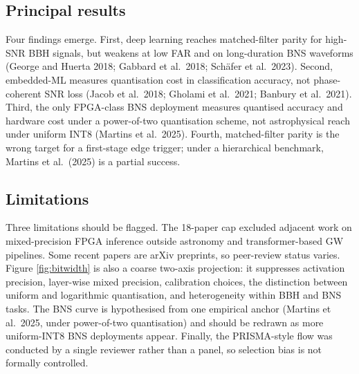 \documentclass[11pt,a4paper]{article}
\begin{document}
\subsection{Principal results}
Four findings emerge. First, deep learning reaches matched-filter parity for high-SNR BBH signals, but weakens at low FAR and on long-duration BNS waveforms (George and Huerta 2018; Gabbard et al.\ 2018; Schäfer et al.\ 2023). Second, embedded-ML measures quantisation cost in classification accuracy, not phase-coherent SNR loss (Jacob et al.\ 2018; Gholami et al.\ 2021; Banbury et al.\ 2021). Third, the only FPGA-class BNS deployment measures quantised accuracy and hardware cost under a power-of-two quantisation scheme, not astrophysical reach under uniform INT8 (Martins et al.\ 2025). Fourth, matched-filter parity is the wrong target for a first-stage edge trigger; under a hierarchical benchmark, Martins et al.\ (2025) is a partial success.

\subsection{Limitations}
Three limitations should be flagged. The 18-paper cap excluded adjacent work on mixed-precision FPGA inference outside astronomy and transformer-based GW pipelines. Some recent papers are arXiv preprints, so peer-review status varies. Figure \ref{fig:bitwidth} is also a coarse two-axis projection: it suppresses activation precision, layer-wise mixed precision, calibration choices, the distinction between uniform and logarithmic quantisation, and heterogeneity within BBH and BNS tasks. The BNS curve is hypothesised from one empirical anchor (Martins et al.\ 2025, under power-of-two quantisation) and should be redrawn as more uniform-INT8 BNS deployments appear. Finally, the PRISMA-style flow was conducted by a single reviewer rather than a panel, so selection bias is not formally controlled.
\end{document}
